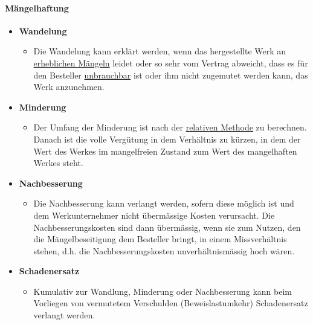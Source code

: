 \paragraph{Mängelhaftung}
\begin{itemize}
    \item \textbf{Wandelung}
    \begin{itemize}
        \item Die Wandelung kann erklärt werden, wenn das hergestellte Werk an \underline{erheblichen Mängeln} leidet oder so sehr vom Vertrag abweicht, dass es für den Besteller \underline{unbrauchbar} ist oder ihm nicht zugemutet werden kann, das Werk anzunehmen.
    \end{itemize}
    \item \textbf{Minderung}
    \begin{itemize}
        \item Der Umfang der Minderung ist nach der \underline{relativen Methode} zu berechnen. Danach ist die volle Vergütung in dem Verhältnis zu kürzen, in dem der Wert des Werkes im mangelfreien Zustand zum Wert des mangelhaften Werkes steht.
    \end{itemize}
    \item \textbf{Nachbesserung}
    \begin{itemize}
        \item Die Nachbesserung kann verlangt werden, sofern diese möglich ist und dem Werkunternehmer nicht übermässige Kosten verursacht. Die Nachbesserungskosten sind dann übermässig, wenn sie zum Nutzen, den die Mängelbeseitigung dem Besteller bringt, in einem Missverhältnis stehen, d.h. die Nachbesserungskosten unverhältnismässig hoch wären.
    \end{itemize}
    \item \textbf{Schadenersatz}
    \begin{itemize}
        \item Kumulativ zur Wandlung, Minderung oder Nachbesserung kann beim Vorliegen von vermutetem Verschulden (Beweislastumkehr) Schadenersatz verlangt werden.
    \end{itemize}
\end{itemize}

